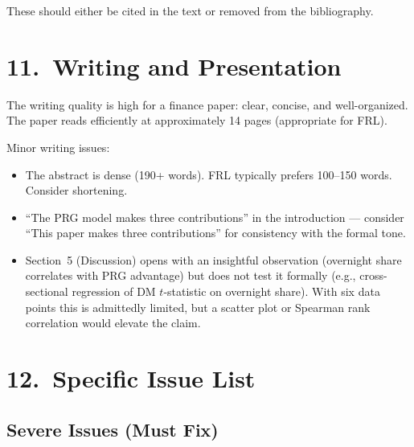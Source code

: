 \documentclass[12pt,a4paper]{article}
\begin{document}
\noindent These should either be cited in the text or removed from the bibliography.


\section*{11.\ Writing and Presentation}

\textcolor{okgreen}{The writing quality is high for a finance paper:} clear, concise, and well-organized. The paper reads efficiently at approximately 14 pages (appropriate for FRL).

\textcolor{warncolor}{Minor writing issues:}
\begin{itemize}[nosep]
\item The abstract is dense (190+ words). FRL typically prefers 100--150 words. Consider shortening.
\item ``The PRG model makes three contributions'' in the introduction --- consider ``This paper makes three contributions'' for consistency with the formal tone.
\item Section~5 (Discussion) opens with an insightful observation (overnight share correlates with PRG advantage) but does not test it formally (e.g., cross-sectional regression of DM $t$-statistic on overnight share). With six data points this is admittedly limited, but a scatter plot or Spearman rank correlation would elevate the claim.
\end{itemize}


\section*{12.\ Specific Issue List}

\subsection*{\textcolor{errorred}{Severe Issues (Must Fix)}}
\end{document}
